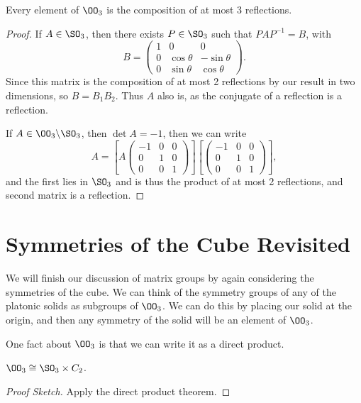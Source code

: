 \documentclass[a4]{scrreprt}
\begin{document}
\begin{corollary}
	Every element of $\OO_3$ is the composition of at most 3 reflections.
\end{corollary}
\begin{proof}
	If $A \in \SO_3$, then there exists $P \in \SO_3$ such that $PAP^{-1} = B$, with
	$$
	B = \begin{pmatrix}
		1 & 0 & 0 \\
		0 & \cos \theta & - \sin \theta \\
		0 & \sin \theta & \cos \theta
	\end{pmatrix}.
	$$
	Since this matrix is the composition of at most 2 reflections by our result in two dimensions, so $B = B_1 B_2$. Thus $A$ also is, as the conjugate of a reflection is a reflection.

	If $A \in \OO_3 \backslash \SO_3$, then $\det A = -1$, then we can write
	$$
	A = \left[A \begin{pmatrix}
		-1 & 0 & 0 \\
		0 & 1 & 0 \\
		0 & 0 & 1
	\end{pmatrix}\right] \left[\begin{pmatrix}
		-1 & 0 & 0 \\
		0 & 1 & 0 \\
		0 & 0 & 1
	\end{pmatrix}\right],
	$$
	and the first lies in $\SO_3$ and is thus the product of at most 2 reflections, and second matrix is a reflection.
\end{proof}



\section{Symmetries of the Cube Revisited}

We will finish our discussion of matrix groups by again considering the symmetries of the cube.
We can think of the symmetry groups of any of the platonic solids as subgroups of $\OO_3$. We can do this by placing our solid at the origin, and then any symmetry of the solid will be an element of $\OO_3$.

One fact about $\OO_3$ is that we can write it as a direct product.

\begin{lemma}
	$\OO_3 \cong \SO_3 \times C_2$.
\end{lemma}
\begin{proof}[Proof Sketch] Apply the direct product theorem.
\end{proof}
\end{document}
